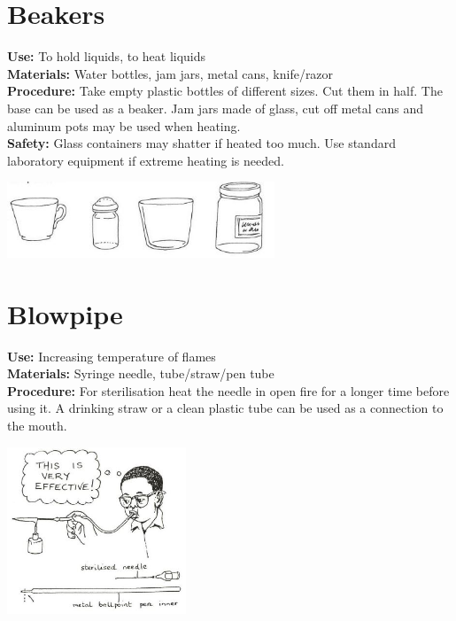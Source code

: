 \begin{multicols}{2}
\section{Beakers} 
\label{sec:beakers}
\vspace{-10pt}
\textbf{Use:} To hold liquids, to heat liquids\\
\textbf{Materials:} Water bottles, jam jars, metal cans, knife\slash razor\\
\textbf{Procedure:} Take empty plastic bottles of different sizes. Cut them in half. The base can be used as a beaker. Jam jars made of glass, cut off metal cans and aluminum pots may be used when heating.\\
\textbf{Safety:} Glass containers may shatter if heated too much. Use standard laboratory equipment if extreme heating is needed.
\begin{center}
\includegraphics[width=8cm]{./img/vso/beakers.jpg}
\end{center} 

\section{Blowpipe} 
\label{sec:blowpipe}
\vspace{-10pt}
\textbf{Use:} Increasing temperature of flames\\
\textbf{Materials:} Syringe needle, tube/straw/pen tube\\
\textbf{Procedure:} For sterilisation heat the needle
in open fire for a longer time before using it. A
drinking straw or a clean plastic tube can be
used as a connection to the mouth. 
\begin{center}
\includegraphics[width=0.4\textwidth]{./img/source/blowpipe.jpg}
\end{center} 


\end{multicols}
